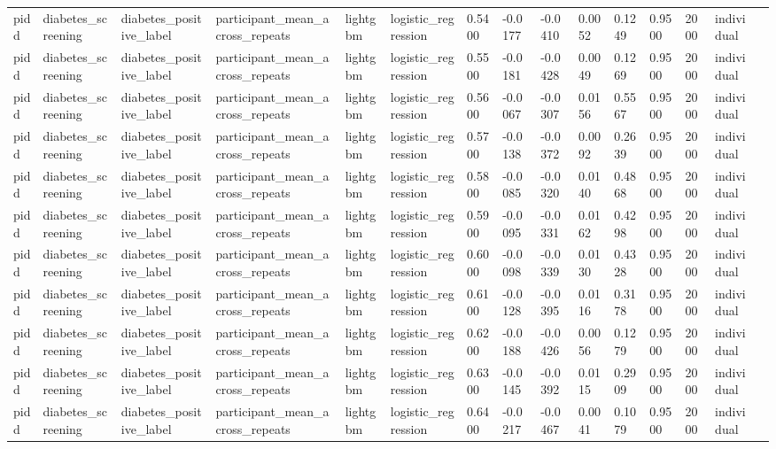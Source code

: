 \begin{tabular}{lllllllllllllll}
pidd & diabetes\_screening & diabetes\_positive\_label & participant\_mean\_across\_repeats & lightgbm & logistic\_regression & 0.5400 & -0.0177 & -0.0410 & 0.0052 & 0.1249 & 0.9500 & 2000 & individual &  \\
pidd & diabetes\_screening & diabetes\_positive\_label & participant\_mean\_across\_repeats & lightgbm & logistic\_regression & 0.5500 & -0.0181 & -0.0428 & 0.0049 & 0.1269 & 0.9500 & 2000 & individual &  \\
pidd & diabetes\_screening & diabetes\_positive\_label & participant\_mean\_across\_repeats & lightgbm & logistic\_regression & 0.5600 & -0.0067 & -0.0307 & 0.0156 & 0.5567 & 0.9500 & 2000 & individual &  \\
pidd & diabetes\_screening & diabetes\_positive\_label & participant\_mean\_across\_repeats & lightgbm & logistic\_regression & 0.5700 & -0.0138 & -0.0372 & 0.0092 & 0.2639 & 0.9500 & 2000 & individual &  \\
pidd & diabetes\_screening & diabetes\_positive\_label & participant\_mean\_across\_repeats & lightgbm & logistic\_regression & 0.5800 & -0.0085 & -0.0320 & 0.0140 & 0.4868 & 0.9500 & 2000 & individual &  \\
pidd & diabetes\_screening & diabetes\_positive\_label & participant\_mean\_across\_repeats & lightgbm & logistic\_regression & 0.5900 & -0.0095 & -0.0331 & 0.0162 & 0.4298 & 0.9500 & 2000 & individual &  \\
pidd & diabetes\_screening & diabetes\_positive\_label & participant\_mean\_across\_repeats & lightgbm & logistic\_regression & 0.6000 & -0.0098 & -0.0339 & 0.0130 & 0.4328 & 0.9500 & 2000 & individual &  \\
pidd & diabetes\_screening & diabetes\_positive\_label & participant\_mean\_across\_repeats & lightgbm & logistic\_regression & 0.6100 & -0.0128 & -0.0395 & 0.0116 & 0.3178 & 0.9500 & 2000 & individual &  \\
pidd & diabetes\_screening & diabetes\_positive\_label & participant\_mean\_across\_repeats & lightgbm & logistic\_regression & 0.6200 & -0.0188 & -0.0426 & 0.0056 & 0.1279 & 0.9500 & 2000 & individual &  \\
pidd & diabetes\_screening & diabetes\_positive\_label & participant\_mean\_across\_repeats & lightgbm & logistic\_regression & 0.6300 & -0.0145 & -0.0392 & 0.0115 & 0.2909 & 0.9500 & 2000 & individual &  \\
pidd & diabetes\_screening & diabetes\_positive\_label & participant\_mean\_across\_repeats & lightgbm & logistic\_regression & 0.6400 & -0.0217 & -0.0467 & 0.0041 & 0.1079 & 0.9500 & 2000 & individual &  \\

\end{tabular}
